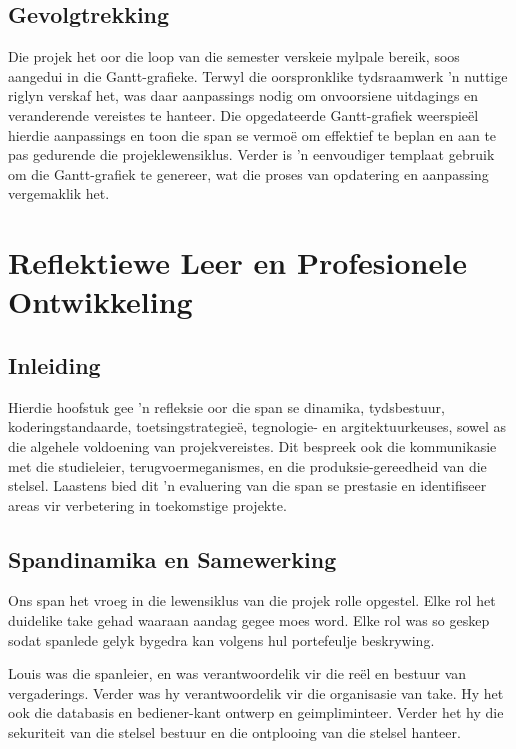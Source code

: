 \section{Gevolgtrekking}

Die projek het oor die loop van die semester verskeie mylpale bereik, soos
aangedui in die Gantt-grafieke. Terwyl die oorspronklike tydsraamwerk 'n nuttige
riglyn verskaf het, was daar aanpassings nodig om onvoorsiene uitdagings en
veranderende vereistes te hanteer. Die opgedateerde Gantt-grafiek weerspieël
hierdie aanpassings en toon die span se vermoë om effektief te beplan en aan te
pas gedurende die projeklewensiklus. Verder is 'n eenvoudiger templaat gebruik om die Gantt-grafiek te genereer, wat die proses van opdatering en aanpassing vergemaklik het.

\chapter{Reflektiewe Leer en Profesionele Ontwikkeling}

\section{Inleiding}
Hierdie hoofstuk gee 'n refleksie oor die span se dinamika, tydsbestuur, koderingstandaarde, toetsingstrategieë, tegnologie- en argitektuurkeuses, sowel as die algehele voldoening van projekvereistes. Dit bespreek ook die kommunikasie met die studieleier, terugvoermeganismes, en die produksie-gereedheid van die stelsel. Laastens bied dit 'n evaluering van die span se prestasie en identifiseer areas vir verbetering in toekomstige projekte.

\section{Spandinamika en Samewerking}

Ons span het vroeg in die lewensiklus van die projek rolle opgestel. Elke rol
het duidelike take gehad waaraan aandag gegee moes word. Elke rol was so geskep
sodat spanlede gelyk bygedra kan volgens hul portefeulje beskrywing.

Louis was die spanleier, en was verantwoordelik vir die reël en
bestuur van vergaderings. Verder was hy verantwoordelik vir die organisasie
van take. Hy het ook die databasis en bediener-kant ontwerp en
geimpliminteer. Verder het hy die sekuriteit van die stelsel bestuur en die
ontplooing van die stelsel hanteer.

